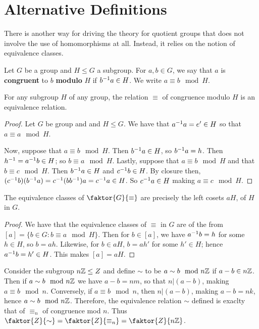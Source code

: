 \section{Alternative Definitions}
\label{section_3.2}

There is another way for driving the theory for quotient groups that does not
involve the use of homomorphisms at all. Instead, it relies on the notion of
equivalence classes.

\begin{definition}
  Let $G$ be a group and  $H \leq G$ a subgroup. For $a,b \in G$, we say that
  $a$ is  \textbf{congruent} to $b$ \textbf{modulo} $H$ if $b^{-1}a \in H$.
  We write $a \equiv b \mod{H}$.
\end{definition}

\begin{proposition}\label{proposition_3.2.1}
  For any subgroup $H$ of any group, the relation $\equiv$ of congruence
  modulo $H$ is an equivalence relation.
\end{proposition}
\begin{proof}
  Let $G$ be group and and  $H \leq G$. We have that  $a^{-1}a = e' \in H$ so
  that $a \equiv a \mod{H}$.

  Now, suppose that $a \equiv b \mod{H}$. Then $b^{-1}a \in H$, so
  $b^{-1}a=h$. Then $h^{-1}=a^{-1}b \in H$; so $b \equiv a \mod{H}$.
  Lastly, suppose that $a \equiv b \mod{H}$ and that $b \equiv c \mod{H}$.
  Then  $b^{-1}a \in H$ and $c^{-1}b \in H$. By closure then,
  $(c^{-1}b)(b^{-1}a)=c^{-1}(bb^{-1})a=c^{-1}a \in H$. So $c^{-1}a \in
  H$ making $a \equiv c \mod{H}$.
\end{proof}
\begin{corollary}
  The equivalence classes of $\faktor{G}{\equiv}$ are precisely the left
  cosets $aH$, of $H$ in  $G$.
\end{corollary}
\begin{proof}
  We have that the equivalence classes of $\equiv$ in  $G$ are of the from
  $[a]=\{b \in G : b \equiv a \mod{H}\}$. Then for $b \in [a]$, we have
  $a^{-1}b=h$ for some $h \in H$, so  $b=ah$. Likewise, for  $b \in aH$,
  $b=ah'$ for some $h' \in H$; hence  $a^{-1}b =h' \in H$. This makes
  $[a]=aH$.
\end{proof}

\begin{example}\label{example_3.3}
  Consider the subgroup $n\mathbb{Z} \leq Z$ and define  $\sim$ to be $a \sim b
  \mod{n\mathbb{Z}}$ if $a-b \in n\mathbb{Z}$. Then if  $a \sim b \mod{n\mathbb{Z}}$ we have
  $a-b=nm$, so that  $n|(a-b)$, making $a \equiv b \mod{n}$. Conversely, if $a
  \equiv b \mod{n}$, then $n|(a-b)$, making $a-b=nk$, hence  $a \sim b
  \mod{n\mathbb{Z}}$. Therefore, the equivalence relation $\sim$ defined is exaclty
  that of $\equiv_n$ of congruence mod $n$. Thus
  $\faktor{Z}{\sim}=\faktor{Z}{\equiv_n}=\faktor{Z}{n\Z}$.
\end{example}

